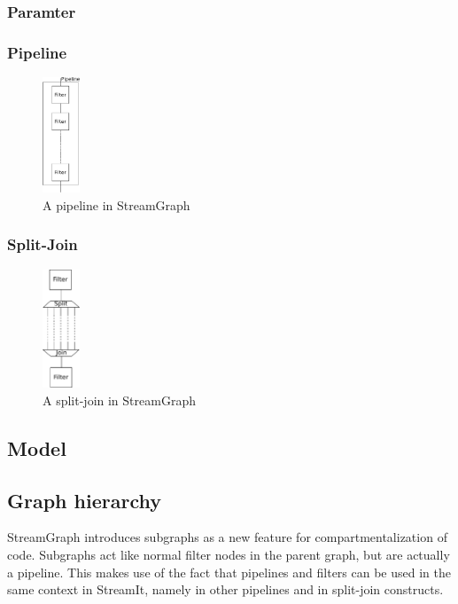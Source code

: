 \documentclass[journal]{IEEEtran}
\begin{document}
\subsubsection{Paramter}
\subsubsection{Pipeline}
\begin{figure}[h]
	\centering
	\includegraphics[width=0.1\textwidth]{PipelineGraphic}
	\caption{A pipeline in StreamGraph}
	\label{fig_filter_node}
\end{figure}
\subsubsection{Split-Join}
\begin{figure}[h]
	\centering
	\includegraphics[width=0.1\textwidth]{SplitJoinGraphic}
	\caption{A split-join in StreamGraph}
	\label{fig_filter_node}
\end{figure}



\subsection{Model}

\subsection{Graph hierarchy}

StreamGraph introduces subgraphs as a new feature for compartmentalization of
code. Subgraphs act like normal filter nodes in the parent graph, but are
actually a pipeline. This makes use of the fact that pipelines and filters can
be used in the same context in StreamIt, namely in other pipelines and in
split-join constructs.
\end{document}
